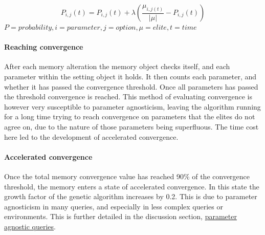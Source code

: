 \documentclass[a4paper,english]{report}
\begin{document}
		\begin{equation}\label{math:probability_vector}
		P_{i,j}(t) = P_{i,j}(t)+\lambda\left(\frac{\mu_{i,j(t)}}{|\mu|}-P_{i,j}(t)\right)
		\end{equation}
		{\centering
		\begin{math}
		P = probability, i = parameter, j = option, \mu = elite, t = time
		\end{math}\\
		}
		\paragraph{Reaching convergence}
		After each memory alteration the memory object checks itself, and each parameter within the setting object it holds. It then counts each parameter, and whether it has passed the convergence threshold. Once all parameters has passed the threshold convergence is reached. This method of evaluating convergence is however very susceptible to parameter agnosticism, leaving the algorithm running for a long time trying to reach convergence on parameters that the elites do not agree on, due to the nature of those parameters being superfluous. The time cost here led to the development of accelerated convergence.
				
		\paragraph{Accelerated convergence}
		Once the total memory convergence value has reached 90\% of the convergence threshold, the memory enters a state of accelerated convergence. In this state the growth factor of the genetic algorithm increases by 0.2. This is due to parameter agnosticism in many queries, and especially in less complex queries or environments. This is further detailed in the discussion section, \hyperref[sec:param_agno]{parameter agnostic queries}.
		
\end{document}
